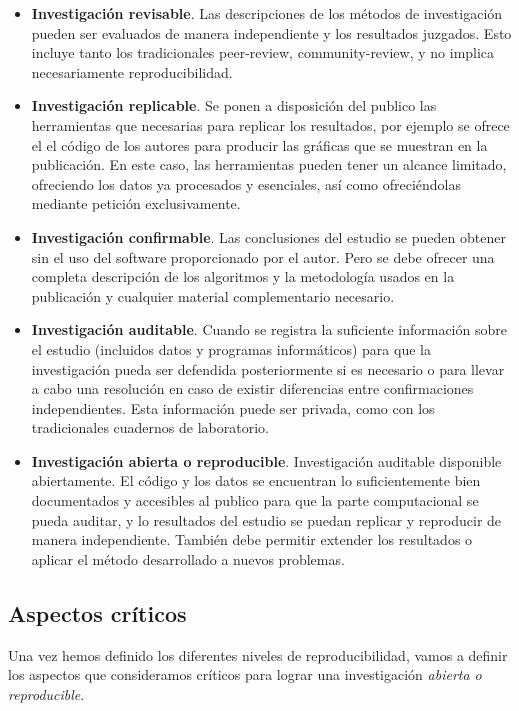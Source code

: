 \documentclass[
  12pt,
  a4paperpaper,
]{report}
\begin{document}
\begin{itemize}
\item
  \textbf{Investigación revisable}. Las descripciones de los métodos de
  investigación pueden ser evaluados de manera independiente y los
  resultados juzgados. Esto incluye tanto los tradicionales peer-review,
  community-review, y no implica necesariamente reproducibilidad.
\item
  \textbf{Investigación replicable}. Se ponen a disposición del publico
  las herramientas que necesarias para replicar los resultados, por
  ejemplo se ofrece el el código de los autores para producir las
  gráficas que se muestran en la publicación. En este caso, las
  herramientas pueden tener un alcance limitado, ofreciendo los datos ya
  procesados y esenciales, así como ofreciéndolas mediante petición
  exclusivamente.
\item
  \textbf{Investigación confirmable}. Las conclusiones del estudio se
  pueden obtener sin el uso del software proporcionado por el autor.
  Pero se debe ofrecer una completa descripción de los algoritmos y la
  metodología usados en la publicación y cualquier material
  complementario necesario.
\item
  \textbf{Investigación auditable}. Cuando se registra la suficiente
  información sobre el estudio (incluidos datos y programas
  informáticos) para que la investigación pueda ser defendida
  posteriormente si es necesario o para llevar a cabo una resolución en
  caso de existir diferencias entre confirmaciones independientes. Esta
  información puede ser privada, como con los tradicionales cuadernos de
  laboratorio.
\item
  \textbf{Investigación abierta o reproducible}. Investigación auditable
  disponible abiertamente. El código y los datos se encuentran lo
  suficientemente bien documentados y accesibles al publico para que la
  parte computacional se pueda auditar, y lo resultados del estudio se
  puedan replicar y reproducir de manera independiente. También debe
  permitir extender los resultados o aplicar el método desarrollado a
  nuevos problemas.
\end{itemize}

\hypertarget{aspectos-cruxedticos}{%
\subsection{Aspectos críticos}\label{aspectos-cruxedticos}}

Una vez hemos definido los diferentes niveles de reproducibilidad, vamos
a definir los aspectos que consideramos críticos para lograr una
investigación \emph{abierta o reproducible}.
\end{document}
